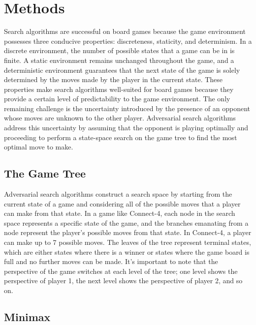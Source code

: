 \documentclass[11pt]{article}
\begin{document}
\section{Methods}


Search algorithms are successful on board games because the game environment possesses three 
conducive properties: discreteness, staticity, and determinism. 
In a discrete environment, the number of possible states that a game can be in is finite. 
A static environment remains unchanged throughout the game, and a deterministic environment guarantees 
that the next state of the game is solely determined by the moves made by the player in the current state. 
These properties make search algorithms well-suited for board games because they provide a certain level of 
predictability to the game environment. The only remaining challenge is the uncertainty introduced by the 
presence of an opponent whose moves are unknown to the other player. Adversarial search algorithms address 
this uncertainty by assuming that the opponent is playing optimally and proceeding to perform a state-space 
search on the game tree to find the most optimal move to make.

\subsection{The Game Tree}

Adversarial search algorithms construct a search space by starting from the current state of a game and 
considering all of the possible moves that a player can make from that state. In a game like Connect-4, 
each node in the search space represents a specific state of the game, and the branches emanating from a node
represent the player's possible moves from that state. In Connect-4, a player can make up to 7 possible moves. 
The leaves of the tree represent terminal states, which are either states where there is a winner or states 
where the game board is full and no further moves can be made. It's important to note that the perspective 
of the game switches at each level of the tree; one level shows the perspective of player 1, the next level 
shows the perspective of player 2, and so on.

\subsection{Minimax}
\end{document}
